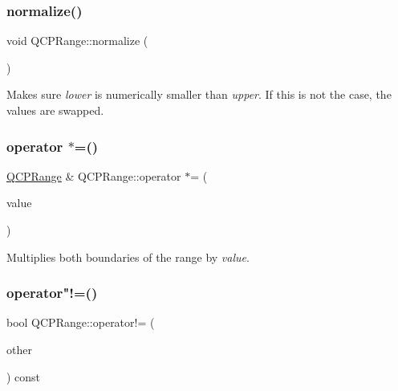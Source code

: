 \subsubsection{\texorpdfstring{normalize()}{normalize()}}
{\footnotesize\ttfamily void Q\+C\+P\+Range\+::normalize (\begin{DoxyParamCaption}{ }\end{DoxyParamCaption})\hspace{0.3cm}{\ttfamily [inline]}}

Makes sure {\itshape lower} is numerically smaller than {\itshape upper}. If this is not the case, the values are swapped. \mbox{\label{class_q_c_p_range_aabf53e9f8285574863f7cc30e0919a93}} 
\subsubsection{\texorpdfstring{operator $\ast$=()}{operator *=()}}
{\footnotesize\ttfamily \mbox{\hyperlink{class_q_c_p_range}{Q\+C\+P\+Range}} \& Q\+C\+P\+Range\+::operator $\ast$= (\begin{DoxyParamCaption}\item[{const double \&}]{value }\end{DoxyParamCaption})\hspace{0.3cm}{\ttfamily [inline]}}

Multiplies both boundaries of the range by {\itshape value}. \mbox{\label{class_q_c_p_range_a4827a37c83b8bb4bf53fcf8f6a257e77}} 
\subsubsection{\texorpdfstring{operator"!=()}{operator!=()}}
{\footnotesize\ttfamily bool Q\+C\+P\+Range\+::operator!= (\begin{DoxyParamCaption}\item[{const \mbox{\hyperlink{class_q_c_p_range}{Q\+C\+P\+Range}} \&}]{other }\end{DoxyParamCaption}) const\hspace{0.3cm}{\ttfamily [inline]}}

\mbox{\label{class_q_c_p_range_afea7c1aa7d08f061cd9bd8832f957df8}} 
